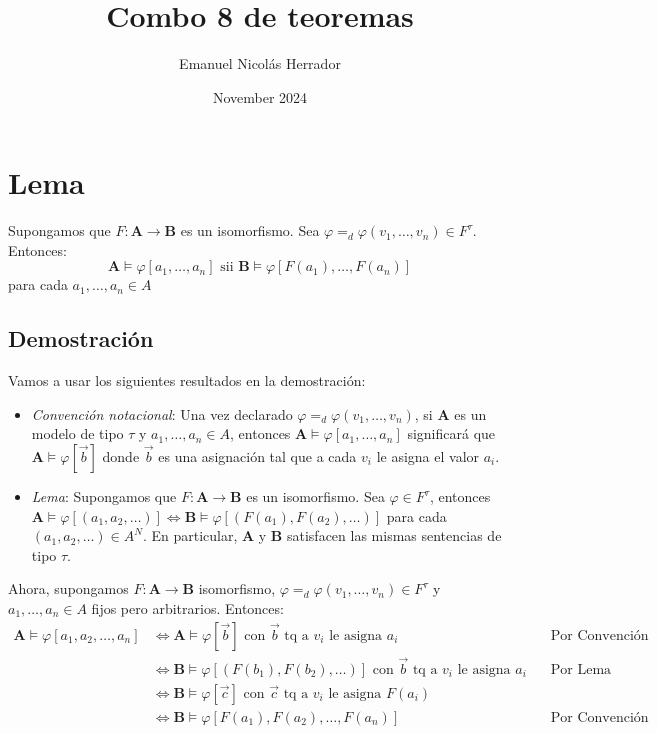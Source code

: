 \documentclass{article}
\title{Combo 8 de teoremas}
\author{Emanuel Nicolás Herrador}
\date{November 2024}
\begin{document}
\maketitle

\section*{Lema}
Supongamos que $F:\mathbf{A}\to\mathbf{B}$ es un isomorfismo. Sea $\varphi=_d\varphi(v_1,\dots,v_n)\in F^\tau$. Entonces:
\begin{equation*}
  \mathbf{A}\vDash\varphi[a_1,\dots,a_n]\text{ sii }\mathbf{B}\vDash\varphi[F(a_1),\dots,F(a_n)]
\end{equation*}
para cada $a_1,\dots,a_n\in A$
\subsection*{Demostración}
Vamos a usar los siguientes resultados en la demostración:
\begin{itemize}
  \item \textit{Convención notacional}: Una vez declarado $\varphi=_d\varphi(v_1,\dots,v_n)$, si $\mathbf{A}$ es un modelo de tipo $\tau$ y $a_1,\dots,a_n\in A$, entonces $\mathbf{A}\vDash\varphi[a_1,\dots,a_n]$ significará que $\mathbf{A}\vDash\varphi[\vec{b}]$ donde $\vec{b}$ es una asignación tal que a cada $v_i$ le asigna el valor $a_i$.
  \item \textit{Lema}: Supongamos que $F:\mathbf{A}\to\mathbf{B}$ es un isomorfismo. Sea $\varphi\in F^\tau$, entonces $\mathbf{A}\vDash\varphi[(a_1,a_2,\dots)]\iff\mathbf{B}\vDash\varphi[(F(a_1),F(a_2),\dots)]$ para cada $(a_1,a_2,\dots)\in A^N$. En particular, $\mathbf{A}$ y $\mathbf{B}$ satisfacen las mismas sentencias de tipo $\tau$.
\end{itemize}

\vspace{0.3cm}
Ahora, supongamos $F:\mathbf{A}\to\mathbf{B}$ isomorfismo, $\varphi=_d\varphi(v_1,\dots,v_n)\in F^\tau$ y $a_1,\dots,a_n\in A$ fijos pero arbitrarios. Entonces:
\begin{equation*}
  \begin{alignedat}{2}
    \mathbf{A}\vDash\varphi[a_1,a_2,\dots,a_n] & \iff\mathbf{A}\vDash\varphi[\vec{b}]\text{ con }\vec{b}\text{ tq a }v_i\text{ le asigna }a_i               &  & \qquad\text{Por Convención Notacional} \\
                                               & \iff\mathbf{B}\vDash\varphi[(F(b_1),F(b_2),\dots)]\text{ con }\vec{b}\text{ tq a }v_i\text{ le asigna }a_i &  & \qquad\text{Por Lema}                  \\
                                               & \iff\mathbf{B}\vDash\varphi[\vec{c}]\text{ con }\vec{c}\text{ tq a }v_i\text{ le asigna }F(a_i)                                                        \\
                                               & \iff\mathbf{B}\vDash\varphi[F(a_1),F(a_2),\dots,F(a_n)]                                                    &  & \qquad\text{Por Convención Notacional} \\
  \end{alignedat}
\end{equation*}
\end{document}
